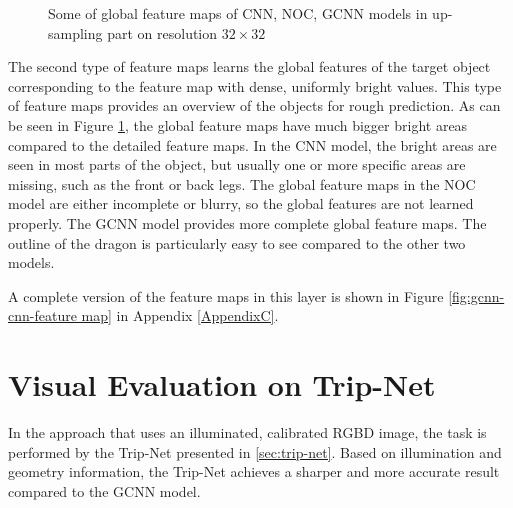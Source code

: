 \begin{figure}[H]
\begin{minipage}{0.32\linewidth}
		\end{minipage}
	
		\decoRule
		\caption{Some of global feature maps of CNN, NOC, GCNN models in up-sampling part on resolution $ 32\times32 $}
		\label{fig:global-feature-maps}
\end{figure}


The second type of feature maps learns the global features of the target object corresponding to the feature map with dense, uniformly bright values. This type of feature maps provides an overview of the objects for rough prediction. As can be seen in Figure \ref{fig:global-feature-maps}, the global feature maps have much bigger bright areas compared to the detailed feature maps. In the CNN model, the bright areas are seen in most parts of the object, but usually one or more specific areas are missing, such as the front or back legs. The global feature maps in the NOC model are either incomplete or blurry, so the global features are not learned properly. The GCNN model provides more complete global feature maps. The outline of the dragon is particularly easy to see compared to the other two models.

A complete version of the feature maps in this layer is shown in Figure \ref{fig:gcnn-cnn-feature map} in Appendix \ref{AppendixC}.



\section{Visual Evaluation on Trip-Net}
In the approach that uses an illuminated, calibrated RGBD image, the task is performed by the Trip-Net presented in \ref{sec:trip-net}. Based on illumination and geometry information, the Trip-Net achieves a sharper and more accurate result compared to the GCNN model.


